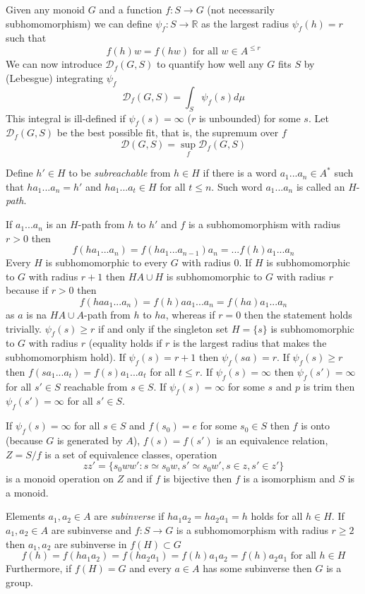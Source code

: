 \documentclass[oneside,english,logo]{amuthesis}
\begin{document}
Given any monoid $G$ and a function $f:S\rightarrow G$ (not necessarily subhomomorphism) we can define $\psi_f:S \rightarrow \mathbb{R}$ as the largest radius $\psi_f(h)=r$ such that
\[
f(h)w=f(hw)\text{ for all } w\in A^{\le r}
\]
We can now introduce $\mathcal{D}_f(G,S)$ to quantify how well any $G$ fits $S$ by (Lebesgue) integrating $\psi_f$
\[
\mathcal{D}_f(G,S) = \int_S \psi_f(s) d \mu
\]
This integral is ill-defined if $\psi_f(s)=\infty$ ($r$ is unbounded) for some $s$.
Let $\mathcal{D}_f(G,S)$ be the best possible fit, that is, the supremum over $f$ \[
\mathcal{D}(G,S) = \sup_f \mathcal{D}_f(G,S)
\]

Define $h'\in H$ to be \textit{subreachable} from $h\in H$ if there is a word $a_1...a_n\in A^*$ such that $ha_1...a_n=h'$ and $ha_1...a_t\in H$ for all $t\le n$. Such word $a_1...a_n$ is called an $H$-\textit{path}.

 
If $a_1...a_n$ is an $H$-path from $h$ to $h'$ and $f$ is a subhomomorphism with radius $r>0$ then \[
	f(ha_1...a_n)=f(ha_1...a_{n-1})a_n=...f(h)a_1...a_n
\]
Every $H$ is subhomomorphic to every $G$ with radius $0$.
If $H$ is subhomomorphic to $G$ with radius $r+1$ then $HA\cup H$ is subhomomorphic to $G$ with radius $r$ because  if $r>0$ then
\[
f(haa_1...a_n)=f(h)aa_1...a_n=f(ha)a_1...a_n
\]
as $a$ is na $HA\cup A$-path from $h$ to $ha$, whereas if $r=0$ then the statement holds trivially.
$\psi_f(s)\ge r$ if and only if the singleton set $H=\{s\}$ is subhomomorphic to $G$ with radius $r$ (equality holds if $r$ is the largest radius that makes the subhomomorphism hold). 
If $\psi_f(s)= r+1$ then $\psi_f(sa)= r$. If $\psi_f(s)\ge r$ then $f(sa_1...a_t)=f(s)a_1...a_t$ for all $t\le r$.
If $\psi_f(s)=\infty$ then $\psi_f(s')=\infty$ for all $s'\in S$ reachable from $s\in S$. If $\psi_f(s)=\infty$ for some $s$ and $p$ is trim then $\psi_f(s')=\infty$ for all $s'\in S$.

If $\psi_f(s)=\infty$ for all $s\in S$ and $f(s_0)=e$ for some $s_0\in S$ then $f$ is onto (because $G$ is generated by $A$), $f(s)=f(s')$ is an equivalence relation, $Z=S/f$ is a set of equivalence classes, operation \[
zz'=\{s_0ww':s\simeq s_0w, s'\simeq s_0w', s\in z, s' \in z'\}
\] 
is a monoid operation on $Z$ and if $f$ is bijective then $f$ is a isomorphism and $S$ is a monoid.

Elements $a_1,a_2\in A$ are \textit{subinverse} if $ha_1a_2=ha_2a_1=h$ holds for all $h\in H$. If $a_1,a_2\in A$ are subinverse and $f:S\rightarrow G$ is a subhomomorphism with radius $r\ge 2$ then $a_1,a_2$ are subinverse in $f(H)\subset G$
\[
f(h)=f(ha_1a_2)=f(ha_2a_1)=f(h)a_1a_2=f(h)a_2a_1\text{ for all }h\in H
\]
Furthermore, if $f(H)=G$ and every $a\in A$ has some subinverse then $G$ is a group.
\end{document}
